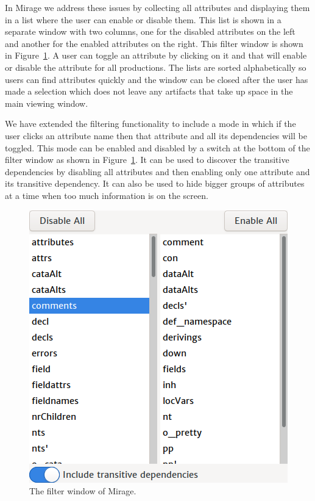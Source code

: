 \documentclass[11pt]{article}
\begin{document}
In Mirage we address these issues by collecting all attributes and displaying them in a list where the user can enable or disable them. This list is shown in a separate window with two columns, one for the disabled attributes on the left and another for the enabled attributes on the right. This filter window is shown in Figure~\ref{filter-window-mirage}. A user can toggle an attribute by clicking on it and that will enable or disable the attribute for all productions. The lists are sorted alphabetically so users can find attributes quickly and the window can be closed after the user has made a selection which does not leave any artifacts that take up space in the main viewing window.

We have extended the filtering functionality to include a mode in which if the user clicks an attribute name then that attribute and all its dependencies will be toggled. This mode can be enabled and disabled by a switch at the bottom of the filter window as shown in Figure~\ref{filter-window-mirage}. It can be used to discover the transitive dependencies by disabling all attributes and then enabling only one attribute and its transitive dependency. It can also be used to hide bigger groups of attributes at a time when too much information is on the screen. 

\begin{figure}[h]
  \centering
  \includegraphics[scale=0.5]{filter-window-mirage}
  \caption{The filter window of Mirage.}
  \label{filter-window-mirage}
\end{figure}
\end{document}
